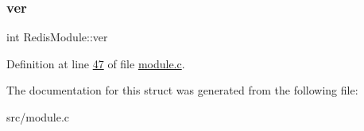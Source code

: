 \subsubsection{\texorpdfstring{ver}{ver}}
{\footnotesize\ttfamily int Redis\+Module\+::ver}



Definition at line \hyperlink{module_8c_source_l00047}{47} of file \hyperlink{module_8c_source}{module.\+c}.



The documentation for this struct was generated from the following file\+:\begin{DoxyCompactItemize}
\item 
src/module.\+c\end{DoxyCompactItemize}
